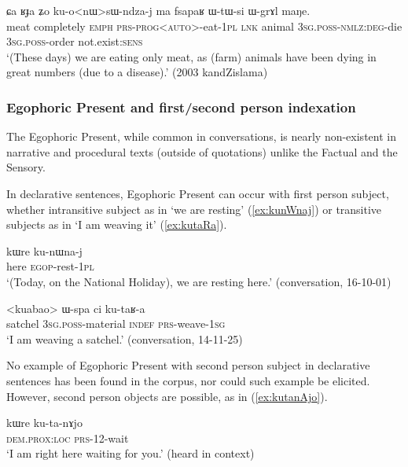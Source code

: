 \begin{exe}
\ex \label{ex:konWsWndzaj2}
\gll ɕa ʁɟa ʑo ku-o<nɯ>sɯ-ndza-j ma fsapaʁ ɯ-tɯ-si ɯ-grɤl maŋe. \\
meat completely \textsc{emph} \textsc{prs}-\textsc{prog}<\textsc{auto}>-eat-\textsc{1pl} \textsc{lnk} animal \textsc{3sg}.\textsc{poss}-\textsc{nmlz}:\textsc{deg}-die \textsc{3sg}.\textsc{poss}-order not.exist:\textsc{sens} \\
\glt `(These days) we are eating only meat, as (farm) animals have been dying in great numbers (due to a disease).' (2003 kandZislama)
\end{exe}

\subsubsection{Egophoric Present and first/second person indexation} \label{sec:egophoric.evd} \label{sec:egophoric.interrogative}
The Egophoric Present, while common in conversations, is nearly non-existent in narrative and procedural texts (outside of quotations) unlike the Factual and the Sensory. 

In declarative sentences, Egophoric Present can occur with first person subject, whether intransitive subject as in  `we are resting' (\ref{ex:kunWnaj}) or transitive subjects as in  `I am weaving it' (\ref{ex:kutaRa}).

\begin{exe}
	\ex \label{ex:kunWnaj}
	\gll kɯre ku-nɯna-j \\
	here \textsc{egop}-rest-\textsc{1pl} \\
	\glt `(Today, on the National Holiday), we are resting here.' (conversation, 16-10-01)
\end{exe}
	
\begin{exe}
\ex \label{ex:kutaRa}
\gll <kuabao> ɯ-spa ci ku-taʁ-a \\
satchel \textsc{3sg}.\textsc{poss}-material \textsc{indef} \textsc{prs}-weave-\textsc{1sg} \\
\glt `I am weaving a satchel.' (conversation, 14-11-25)
\end{exe}

No example of Egophoric Present with second person subject in declarative sentences has been found in the corpus, nor could such example be elicited. However, second person objects are possible, as in (\ref{ex:kutanAjo}).

\begin{exe}
	\ex \label{ex:kutanAjo}
	\gll kɯre ku-ta-nɤjo \\
	\textsc{dem}.\textsc{prox}:\textsc{loc} \textsc{prs}-1\fl{}2-wait \\
	\glt `I am right here waiting for you.' (heard in context)
\end{exe}

